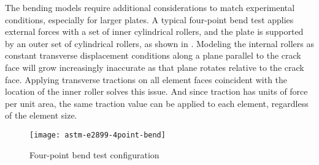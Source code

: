 The bending models require additional considerations to match experimental conditions, especially for larger plates.
A typical four-point bend test applies external forces with a set of inner cylindrical rollers, and the plate is supported by an outer set of cylindrical rollers, as shown in .
Modeling the internal rollers as constant transverse displacement conditions along a plane parallel to the crack face will grow increasingly inaccurate as that plane rotates relative to the crack face.
Applying transverse tractions on all element faces coincident with the location of the inner roller solves this issue.
And since traction has units of force per unit area, the same traction value can be applied to each element, regardless of the element size.
\begin{figure}[tbp]
\centering
\texttt{[image: astm-e2899-4point-bend]}
\caption{\label{fig:astm-e2899-4point-bend} Four-point bend test configuration \cite{astme2899}}
\end{figure}

